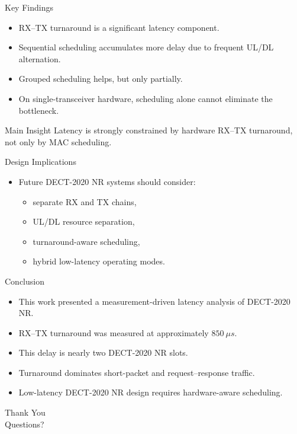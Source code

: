 \documentclass[10pt]{beamer}
\begin{document}
\begin{frame}{Key Findings}
\begin{itemize}
    \item RX--TX turnaround is a significant latency component.
    \item Sequential scheduling accumulates more delay due to frequent UL/DL alternation.
    \item Grouped scheduling helps, but only partially.
    \item On single-transceiver hardware, scheduling alone cannot eliminate the bottleneck.
\end{itemize}

\begin{alertblock}{Main Insight}
Latency is strongly constrained by hardware RX--TX turnaround, not only by MAC scheduling.
\end{alertblock}
\end{frame}

\begin{frame}{Design Implications}
\begin{itemize}
    \item Future DECT-2020 NR systems should consider:
    \begin{itemize}
        \item separate RX and TX chains,
        \item UL/DL resource separation,
        \item turnaround-aware scheduling,
        \item hybrid low-latency operating modes.
    \end{itemize}
\end{itemize}
\end{frame}

\begin{frame}{Conclusion}
\begin{itemize}
    \item This work presented a measurement-driven latency analysis of DECT-2020 NR.
    \item RX--TX turnaround was measured at approximately $850~\mu s$.
    \item This delay is nearly two DECT-2020 NR slots.
    \item Turnaround dominates short-packet and request--response traffic.
    \item Low-latency DECT-2020 NR design requires hardware-aware scheduling.
\end{itemize}
\end{frame}

\begin{frame}
\centering
\Huge Thank You\\[0.5cm]
\Large Questions?
\end{frame}
\end{document}
